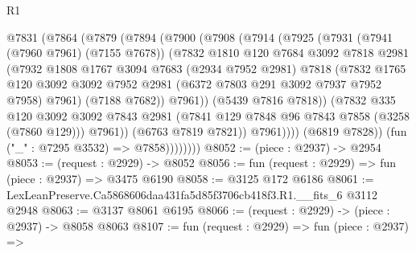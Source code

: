 \begin{lexlean}{R1}
\begin{coremodule}
                  @7831
                    (@7864
                      (@7879
                        (@7894
                          (@7900
                            (@7908
                              (@7914
                                (@7925
                                  (@7931
                                    (@7941 (@7960 @7961) (@7155 @7678))
                                    (@7832
                                      @1810
                                      @120
                                      @7684
                                      @3092
                                      @7818
                                      @2981
                                      (@7932
                                        @1808
                                        @1767
                                        @3094
                                        @7683
                                        (@2934 @7952 @2981)
                                        @7818
                                        (@7832
                                          @1765
                                          @120
                                          @3092
                                          @3092
                                          @7952
                                          @2981
                                          (@6372 @7803 @291 @3092 @7937 @7952 @7958)
                                          @7961)
                                        (@7188 @7682))
                                      @7961))
                                  (@5439 @7816 @7818))
                                (@7832
                                  @335
                                  @120
                                  @3092
                                  @3092
                                  @7843
                                  @2981
                                  (@7841 @129 @7848 @96 @7843 @7858 (@3258 (@7860 @129)))
                                  @7961))
                              (@6763 @7819 @7821))
                            @7961))))
                    (@6819 @7828))
                  (fun ("_" : @7295 @3532) => @7858))))))))
@8052 := (piece : @2937) -> @2954
@8053 := (request : @2929) -> @8052
@8056 := fun (request : @2929) => fun (piece : @2937) => @3475 @6190
@8058 := @3125 @172 @6186
@8061 := LexLeanPreserve.Ca5868606daa431fa5d85f3706cb418f3.R1.__fits_6 @3112 @2948
@8063 := @3137 @8061 @6195
@8066 := (request : @2929) -> (piece : @2937) -> @8058 @8063
@8107 := fun (request : @2929) =>
  fun (piece : @2937) =>

\end{coremodule}
\end{lexlean}
